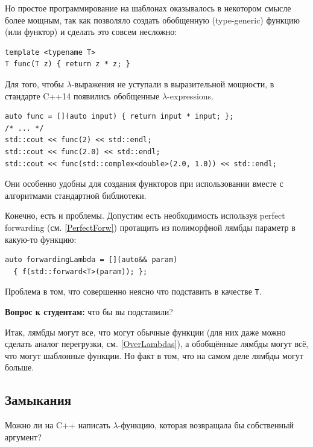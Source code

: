 \documentclass[a4paper,12pt,oneside]{book}
\newif\ifanswers
\begin{document}
Но простое программирование на шаблонах оказывалось в некотором смысле более мощным, так как позволяло создать обобщенную (type-generic) функцию (или функтор) и сделать это совсем несложно:

\begin{lstlisting}
template <typename T>
T func(T z) { return z * z; }
\end{lstlisting}

Для того, чтобы $\lambda$-выражения не уступали в выразительной мощности, в стандарте C++14 появились обобщенные $\lambda$-expressions.

\begin{lstlisting}
auto func = [](auto input) { return input * input; };
/* ... */
std::cout << func(2) << std::endl;
std::cout << func(2.0) << std::endl;
std::cout << func(std::complex<double>(2.0, 1.0)) << std::endl;
\end{lstlisting}

Они особенно удобны для создания функторов при использовании вместе с алгоритмами стандартной библиотеки.

Конечно, есть и проблемы. Допустим есть необходимость используя perfect forwarding (см. \ref{PerfectForw}) протащить из полиморфной лямбды параметр в какую-то функцию:

\begin{lstlisting}
auto forwardingLambda = [](auto&& param) 
  { f(std::forward<T>(param)); };
\end{lstlisting}

Проблема в том, что совершенно неясно что подставить в качестве \lstinline!T!.

\textbf{Вопрос к студентам:} что бы вы подставили?

\ifanswers
Правильный ответ: \lstinline!decltype(param)!. Этот ответ основан на механике \lstinline!std::forward! как условного перемещения. Если \lstinline!T! подходит для выбора, то и \lstinline!T&&! тоже подходит.
\fi

Итак, лямбды могут все, что могут обычные функции (для них даже можно сделать аналог перегрузки, см. \ref{OverLambdas}), а обобщённые лямбды могут всё, что могут шаблонные функции. Но факт в том, что на самом деле лямбды могут больше.

\subsection{Замыкания}\label{Closures}

Можно ли на C++ написать $\lambda$-функцию, которая возвращала бы собственный аргумент? 
\end{document}
